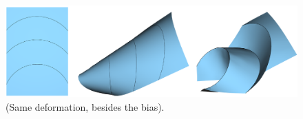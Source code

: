 
\begin{figure} [h]
	\centering
	\includegraphics[width=\linewidth]{figures/folded_and_not_folded}
	\caption{(Same deformation, besides the bias). }
	\label{fig:folded_and_not_folded}
\end{figure}